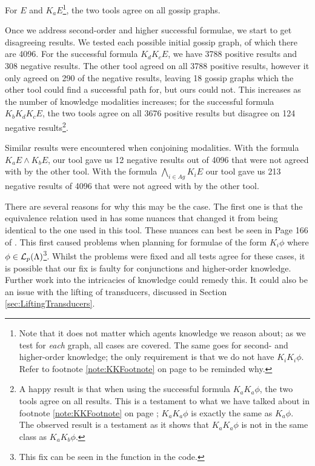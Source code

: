\documentclass[10pt, a4paper]{report}
\begin{document}

For $E$ and $K_a E$\footnote{Note that it does not matter which agents knowledge
  we reason about; as we test for \emph{each} graph, all cases are covered. The
  same goes for second- and higher-order knowledge; the only requirement is that we do not
  have $K_i K_i \phi$. Refer to footnote \ref{note:KKFootnote} on page 
  \pageref{note:KKFootnote} to be reminded why.}, the two tools agree on all
gossip graphs.

Once we address second-order and higher successful formulae, we start to get
disagreeing results. We tested each possible initial gossip graph, of which
there are 4096. For the successful formula $K_d K_c E$, we have 3788 positive
results and 308 negative results. The other tool agreed on all 3788 positive
results, however it only agreed on 290 of the negative results, leaving 18
gossip graphs which the other tool could find a successful path for, but ours
could not. This increases as the number of knowledge modalities increases; for
the successful formula $K_b K_d K_c E$, the two tools agree on all 3676 positive
results but disagree on 124 negative results\footnote{A happy result is that
  when using the successful formula $K_a K_a \phi$, the two tools agree on all
  results. This is a testament to what we have talked about in footnote
  \ref{note:KKFootnote} on page \pageref{note:KKFootnote}; $K_a K_a \phi$ is
  exactly the same as $K_a \phi$. The observed result is a testament as it shows
that $K_a K_a \phi$ is not in the same class as $K_a K_b \phi$.}.

Similar results were encountered when conjoining modalities. With the formula
$K_a E \land K_b E$, our tool gave us 12 negative results out of 4096 that were
not agreed with by the other tool. With the formula $\bigwedge_{i \in Ag} K_i E$
our tool gave us 213 negative results of 4096 that were not agreed with by the
other tool.

There are several reasons for why this may be the case. The first one is that
the equivalence relation used in \cite{GithubGossip} has some nuances that
changed it from being identical to the one used in this tool. These nuances can
best be seen in Page 166 of \cite{SMCDEL}. This first caused problems when
planning for formulae of the form $K_i \phi$ where $\phi \in
\mathcal{L}_p(\Lambda)$\footnote{This fix can be seen in the 
  function in the code.}. Whilst the problems were fixed and all tests agree for
these cases, it is possible that our fix is faulty for conjunctions and
higher-order knowledge. Further work into the intricacies of knowledge could
remedy this. It could also be an issue with the lifting of transducers,
discussed in Section \ref{sec:LiftingTransducers}.  
\end{document}
